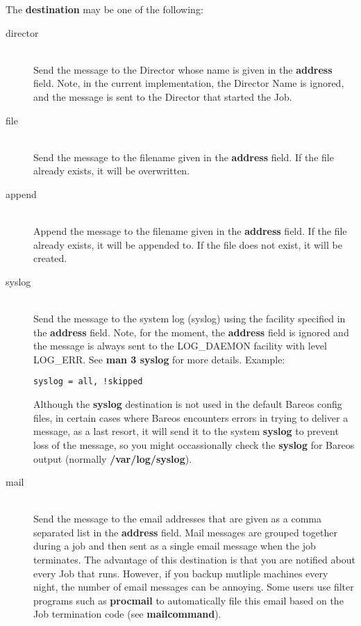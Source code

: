 \begin{description}
The {\bf destination} may be one of the following:

\begin{description}

\item [director] \hfill \\
Send the message to the Director whose name  is given in the {\bf address}
field. Note, in the current  implementation, the Director Name is ignored, and
the message  is sent to the Director that started the Job.

\item [file] \hfill \\
Send the message to the filename given in  the {\bf address} field. If the
file already exists, it will be  overwritten.

\item [append] \hfill \\
Append the message to the filename given  in the {\bf address} field. If the
file already exists, it will  be appended to. If the file does not exist, it
will be created.

\item [syslog] \hfill \\
Send the message to the system log (syslog)  using the facility specified in
the {\bf address} field.  Note, for the moment, the {\bf address} field is
ignored  and the message is always sent to the LOG\_DAEMON facility with
level LOG\_ERR. See {\bf man 3 syslog} for more details. Example:

\begin{verbatim}
syslog = all, !skipped
\end{verbatim}

Although the {\bf syslog} destination is not used in the default Bareos
config files, in certain cases where Bareos encounters errors in trying
to deliver a message, as a last resort, it will send it to the system
{\bf syslog} to prevent loss of the message, so you might occassionally
check the {\bf syslog} for Bareos output (normally {\bf
/var/log/syslog}).

\item [mail] \hfill \\
Send the message to the email addresses that are given as a comma
separated list in the {\bf address} field.  Mail messages are grouped
together during a job and then sent as a single email message when the
job terminates.  The advantage of this destination is that you are
notified about every Job that runs.  However, if you backup mutliple
machines every night, the number of email messages can be annoying.
Some users use filter programs such as {\bf procmail} to automatically
file this email based on the Job termination code (see {\bf
mailcommand}).


\end{description}
\end{description}
